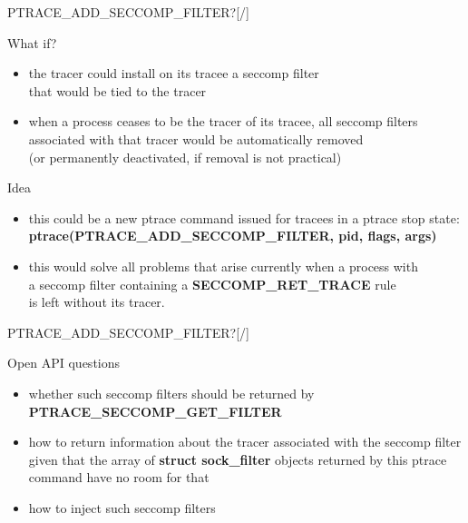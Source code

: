 \documentclass[unicode,aspectratio=169,xcolor={table,dvipsnames,usenames}]{beamer}
\begin{document}
\begin{frame}{\Large PTRACE\_ADD\_SECCOMP\_FILTER?\hfill [\insertframenumber/\inserttotalframenumber]}
\large
\begin{block}{What if?}
\begin{itemize}
	\item the tracer could install on its tracee a seccomp filter \\
		that would be tied to the tracer
	\item when a process ceases to be the tracer of its tracee, all seccomp filters \\
		associated with that tracer would be automatically removed \\
		(or permanently deactivated, if removal is not practical)
\end{itemize}
\end{block}

\begin{block}{Idea}
\begin{itemize}
	\item this could be a new ptrace command issued for tracees in a ptrace stop state:
		\textbf{ptrace(PTRACE\_ADD\_SECCOMP\_FILTER, pid, flags, args)}
	\item this would solve all problems that arise currently when a process with \\
		a seccomp filter containing a \textbf{SECCOMP\_RET\_TRACE} rule \\
		is left without its tracer.
\end{itemize}
\end{block}
\end{frame}

\begin{frame}{\Large PTRACE\_ADD\_SECCOMP\_FILTER?\hfill [\insertframenumber/\inserttotalframenumber]}
\Large
\begin{block}{Open API questions}
\begin{itemize}
	\item whether such seccomp filters should be returned by \textbf{PTRACE\_SECCOMP\_GET\_FILTER}
	\item how to return information about the tracer associated with
		the seccomp filter given that the array of \textbf{struct sock\_filter} objects
		returned by this ptrace command have no room for that
	\item how to inject such seccomp filters
\end{itemize}
\end{block}
\end{frame}
\end{document}
